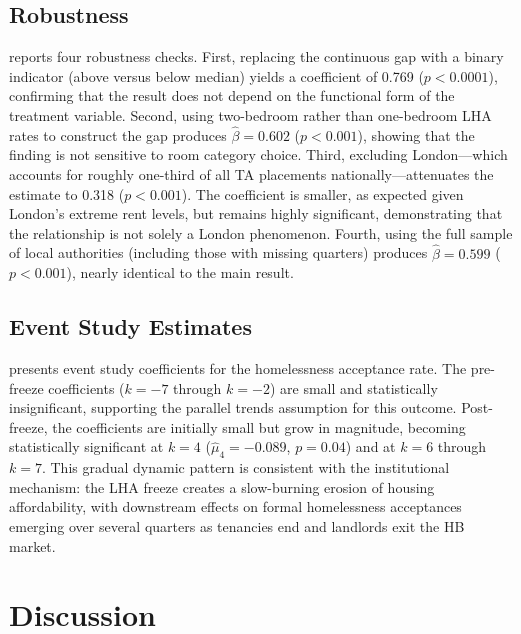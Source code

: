 \documentclass[12pt]{article}
\begin{document}
\subsection{Robustness}



 reports four robustness checks. First, replacing the continuous gap with a binary indicator (above versus below median) yields a coefficient of 0.769 ($p < 0.0001$), confirming that the result does not depend on the functional form of the treatment variable. Second, using two-bedroom rather than one-bedroom LHA rates to construct the gap produces $\hat{\beta} = 0.602$ ($p < 0.001$), showing that the finding is not sensitive to room category choice. Third, excluding London---which accounts for roughly one-third of all TA placements nationally---attenuates the estimate to 0.318 ($p < 0.001$). The coefficient is smaller, as expected given London's extreme rent levels, but remains highly significant, demonstrating that the relationship is not solely a London phenomenon. Fourth, using the full sample of local authorities (including those with missing quarters) produces $\hat{\beta} = 0.599$ ($p < 0.001$), nearly identical to the main result.

\subsection{Event Study Estimates}



 presents event study coefficients for the homelessness acceptance rate. The pre-freeze coefficients ($k = -7$ through $k = -2$) are small and statistically insignificant, supporting the parallel trends assumption for this outcome. Post-freeze, the coefficients are initially small but grow in magnitude, becoming statistically significant at $k = 4$ ($\hat{\mu}_4 = -0.089$, $p = 0.04$) and at $k = 6$ through $k = 7$. This gradual dynamic pattern is consistent with the institutional mechanism: the LHA freeze creates a slow-burning erosion of housing affordability, with downstream effects on formal homelessness acceptances emerging over several quarters as tenancies end and landlords exit the HB market.


\section{Discussion}
\end{document}
